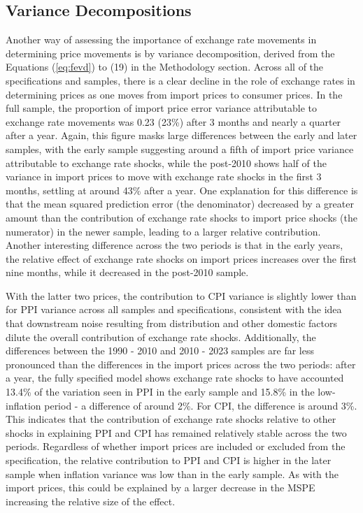 \documentclass[12pt]{article}
\begin{document}
\subsection{Variance Decompositions}



Another way of assessing the importance of exchange rate movements in determining price movements is by variance decomposition, derived from the Equations (\ref{eq:fevd}) to (19) in the Methodology section. Across all of the specifications and samples, there is a clear decline in the role of exchange rates in determining prices as one moves from import prices to consumer prices. In the full sample, the proportion of import price error variance attributable to exchange rate movements was 0.23 (23\%) after 3 months and nearly a quarter after a year. Again, this figure masks large differences between the early and later samples, with the early sample suggesting around a fifth of import price variance attributable to exchange rate shocks, while the post-2010 shows half of the variance in import prices to move with exchange rate shocks in the first 3 months, settling at around 43\% after a year. One explanation for this difference is that the mean squared prediction error (the denominator) decreased  by a greater amount than the contribution of exchange rate shocks to import price shocks (the numerator) in the newer sample, leading to a larger relative contribution. Another interesting difference across the two periods is that in the early years, the relative effect of exchange rate shocks on import prices increases over the first nine months, while it decreased in the post-2010 sample. 

With the latter two prices, the contribution to CPI variance is slightly lower than for PPI variance across all samples and specifications, consistent with the idea that downstream noise resulting from distribution and other domestic factors dilute the overall contribution of exchange rate shocks.  Additionally, the differences between the 1990 - 2010 and 2010 - 2023 samples are far less pronounced than the differences in the import prices across the two periods: after a year, the fully specified model shows exchange rate shocks to have accounted 13.4\% of the variation seen in PPI in the early sample and 15.8\% in the low-inflation period - a difference of around 2\%. For CPI, the difference is around 3\%. This indicates that the contribution of exchange rate shocks relative to other shocks in explaining PPI and CPI has remained relatively stable across the two periods. Regardless of whether import prices are included or excluded from the specification, the relative contribution to PPI and CPI is higher in the later sample when inflation variance was low than in the early sample. As with the import prices, this could be explained by a larger decrease in the MSPE increasing the relative size of the effect. 
\end{document}
